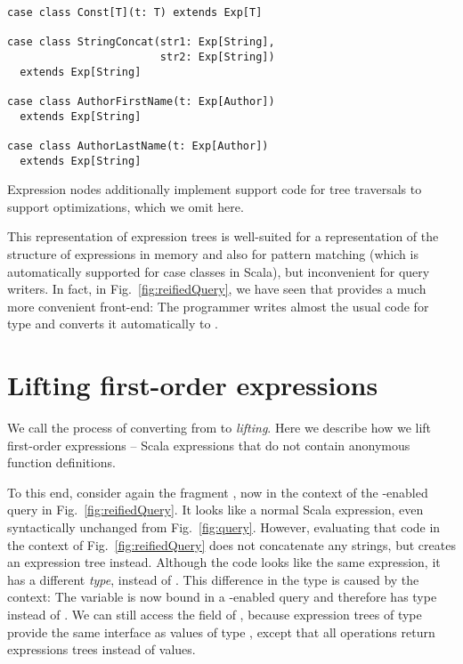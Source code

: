 \begin{lstlisting}
case class Const[T](t: T) extends Exp[T]

case class StringConcat(str1: Exp[String],
                        str2: Exp[String])
  extends Exp[String]

case class AuthorFirstName(t: Exp[Author])
  extends Exp[String]

case class AuthorLastName(t: Exp[Author])
  extends Exp[String]
\end{lstlisting}

Expression nodes additionally implement support code for tree traversals to support optimizations, which we omit here.

This representation of expression trees is well-suited for a representation of the structure of expressions in memory and also for pattern matching (which is automatically supported for case classes in Scala), but inconvenient for query writers. In fact, in Fig.~\ref{fig:reifiedQuery}, we have seen that {\LoS} provides a much more convenient front-end: The programmer writes almost the usual code for type  and {\LoS} converts it automatically to .

\section{Lifting first-order expressions}

We call the process of converting from  to  \emph{lifting}. Here we describe how we lift first-order expressions -- Scala expressions that do
not contain anonymous function definitions.

To this end, consider again the fragment , now in the context of the {\LoS}-enabled query in Fig.~\ref{fig:reifiedQuery}. It looks like a normal Scala expression, even syntactically unchanged from Fig.~\ref{fig:query}. However, evaluating that code in the context of Fig.~\ref{fig:reifiedQuery} does not concatenate any strings, but creates an expression tree instead. Although the code looks like the same expression, it has a different \emph{type},  instead of . This difference in the type is caused by the context: The variable  is now bound in a {\LoS}-enabled query and therefore has type  instead of . We can still access the  field of , because expression trees of type  provide the same interface as values of type , except that all operations return expressions trees instead of values.

